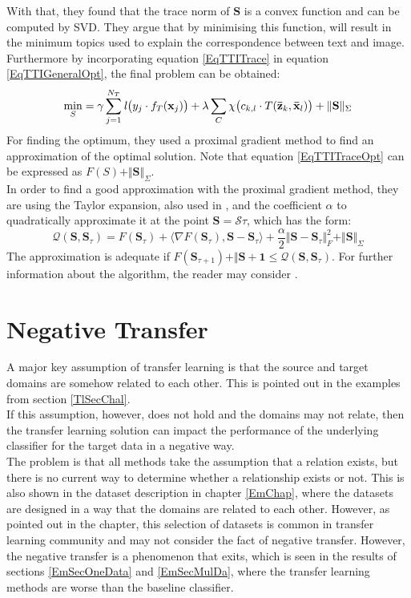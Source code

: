With that, they found that the trace norm of $\mathbf{S}$ is a convex function and can be computed by \ac{SVD}.
They argue that by minimising this function, will result in the minimum topics used to explain the correspondence between text and image.
Furthermore by incorporating equation \eqref{EqTTITrace} in equation \eqref{EqTTIGeneralOpt}, the final problem can be obtained:\cite{Qi.2011}
\begin{equation}\label{EqTTITraceOpt}
		\min_{S} = \gamma \sum_{j=1}^{N_T}\mathit{l}\big( y_j \cdot f_T(\mathbf{x}_j) \big) + \lambda \sum_{C}  \chi \big( c_{k,l} \cdot T(\mathbf{\bar{z}}_k,\mathbf{\bar{x}}_l)\big) + \Vert \mathbf{S}\Vert_\Sigma
\end{equation}
For finding the optimum, they used a proximal gradient method to find an approximation of the optimal solution.
Note that equation \eqref{EqTTITraceOpt} can be expressed as $F(S)+\Vert \mathbf{S}\Vert_\Sigma$.\cite{Qi.2011}\\
In order to find a good approximation with the proximal gradient method, they are using the Taylor expansion, also used in \cite[p. 214]{Bishop.2009}, and the coefficient $\alpha$ to quadratically approximate it at the point $\mathbf{S} = \mathcal{S}\tau$, which has the form:\cite{Qi.2011}
\begin{equation}
	\mathcal{Q}(\mathbf{S},\mathbf{S}_\tau) = F(\mathbf{S}_\tau) + \langle \nabla F(\mathbf{S}_\tau),\mathbf{S}-\mathbf{S}_\tau\rangle + \frac{\alpha}{2}\Vert \mathbf{S} - \mathbf{S}_\tau \Vert_F^2 + \Vert \mathbf{S} \Vert_\Sigma
\end{equation}
The approximation is adequate if $F(\mathbf{S}_{\tau+1}) + \Vert\mathbf{S+1} \le \mathcal{Q}(\mathbf{S},\mathbf{S}_\tau)$.
For further information about the algorithm, the reader may consider \cite{Qi.2011}.

\section{Negative Transfer}\label{TlSecNeg}
A major key assumption of transfer learning is that the source and target domains are somehow related to each other.
This is pointed out in the examples from section \ref{TlSecChal}.\\
If this assumption, however, does not hold and the domains may not relate, then the transfer learning solution can impact the performance of the underlying classifier for the target data in a negative way.\cite[p. 29]{Weiss.2016}\\
The problem is that all methods take the assumption that a relation exists, but there is no current way to determine whether a relationship exists or not.\cite[p. 1672]{Taylor.2009}
This is also shown in the dataset description in chapter \ref{EmChap}, where the datasets are designed in a way that the domains are related to each other.
However, as pointed out in the chapter, this selection of datasets is common in transfer learning community and may not consider the fact of negative transfer.
However, the negative transfer is a phenomenon that exits, which is seen in the results of sections \ref{EmSecOneData} and \ref{EmSecMulDa}, where the transfer learning methods are worse than the baseline classifier.


